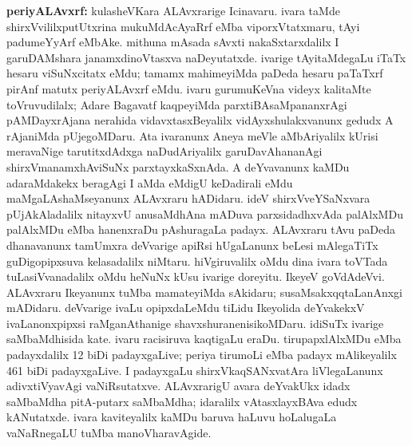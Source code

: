 {\large\textbf{periyALAvxrf:}} kulasheVKara ALAvxrarige Icinavaru. ivara taMde shirxVvililxputUtxrina mukuMdAcAyaRrf eMba viporxVtatxmaru, tAyi padumeYyArf eMbAke. mithuna mAsada sAvxti nakaSxtarxdalilx I garuDAMshara janamxdinoVtasxva naDeyutatxde. ivarige tAyitaMdegaLu iTaTx hesaru viSuNxcitatx eMdu; tamamx mahimeyiMda paDeda hesaru paTaTxrf pirAnf matutx periyALAvxrf eMdu. ivaru gurumuKeVna videyx kalitaMte toVruvudilalx; Adare Bagavatf kaqpeyiMda parxtiBAsaMpananxrAgi pAMDayxrAjana nerahida vidavxtasxBeyalilx vidAyxshulakxvanunx gedudx A rAjaniMda pUjegoMDaru. Ata ivaranunx Aneya meVle aMbAriyalilx kUrisi meravaNige tarutitxdAdxga naDudAriyalilx garuDavAhananAgi shirxVmanamxhAviSuNx parxtayxkaSxnAda. A deYvavanunx kaMDu adaraMdakekx beragAgi I aMda eMdigU keDadirali eMdu maMgaLAshaMseyanunx ALAvxraru hADidaru. ideV shirxVveYSaNxvara pUjAkAladalilx nitayxvU anusaMdhAna mADuva parxsidadhxvAda palAlxMDu palAlxMDu eMba hanenxraDu pAshuragaLa padayx. ALAvxraru tAvu paDeda dhanavanunx tamUmxra deVvarige apiRsi hUgaLanunx beLesi mAlegaTiTx guDigopipxsuva kelasadalilx niMtaru. hiVgiruvalilx oMdu dina ivara toVTada tuLasiVvanadalilx oMdu heNuNx kUsu ivarige doreyitu. IkeyeV goVdAdeVvi. ALAvxraru Ikeyanunx tuMba mamateyiMda sAkidaru; susaMsakxqqtaLanAnxgi mADidaru. deVvarige ivaLu opipxdaLeMdu tiLidu Ikeyolida deYvakekxV ivaLanonxpipxsi raMganAthanige shavxshuranenisikoMDaru. idiSuTx ivarige saMbaMdhisida kate. ivaru racisiruva kaqtigaLu eraDu. tirupapxlAlxMDu eMba padayxdalilx 12 biDi padayx\-gaLive; periya tirumoLi eMba padayx mAlikeyalilx 461 biDi padayxgaLive. I padayxgaLu shirxVkaqSANxva\-tAra liVlegaLanunx adivxtiVyavAgi vaNiRsutatxve. ALAvxrarigU avara deYvakUkx idadx saMbaMdha pitA-putarx saMbaMdha; idaralilx vAtasxlayxBAva edudx kANutatxde. ivara kavite\-yalilx kaMDu baruva haLuvu hoLalugaLa vaNaRnegaLU tuMba manoV\-hara\-vAgide.

